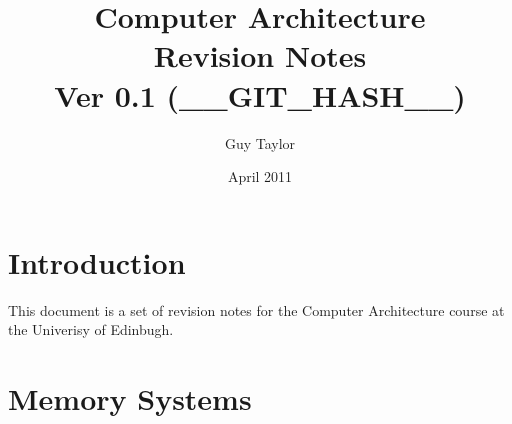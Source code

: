 \documentclass[11pt,twoside,a4paper]{article}
\begin{document}
  
  \title{Computer Architecture \\Revision Notes \\ Ver 0.1 (__GIT_HASH__)}
  \author{Guy Taylor}
  \date{April 2011}
  
  \maketitle
  
  \tableofcontents
  
  \section{Introduction}
    This document is a set of revision notes for the Computer Architecture \cite{car_home} course at the Univerisy of Edinbugh.
  
  \clearpage
  \section{Memory Systems}
        
  
  \clearpage  
  
  
\end{document}
